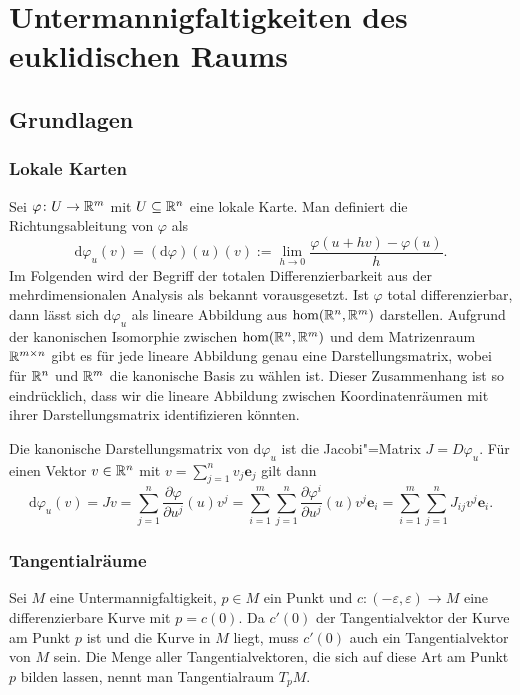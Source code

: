 
\chapter{Untermannigfaltigkeiten des euklidischen Raums}

\section{Grundlagen}

\subsection{Lokale Karten}

Sei $\varphi\colon U\to\mathbb R^m$ mit $U\subseteq\mathbb R^n$ eine lokale Karte.
Man definiert die Richtungsableitung von $\varphi$ als
\begin{equation}
\mathrm d\varphi_u(v) = (\mathrm d\varphi)(u)(v)
:= \lim_{h\to 0}\frac{\varphi(u+hv)-\varphi(u)}{h}.
\end{equation}
Im Folgenden wird der Begriff der totalen Differenzierbarkeit
aus der mehrdimensionalen Analysis als bekannt vorausgesetzt.
Ist $\varphi$ total differenzierbar, dann lässt sich
$\mathrm d\varphi_u$ als lineare Abbildung aus $\hom(\mathbb R^n,\mathbb R^m)$
darstellen. Aufgrund der kanonischen Isomorphie zwischen
$\hom(\mathbb R^n,\mathbb R^m)$ und dem Matrizenraum $\mathbb R^{m\times n}$ gibt
es für jede lineare Abbildung genau eine Darstellungsmatrix,
wobei für $\mathbb R^n$ und $\mathbb R^m$ die kanonische Basis zu wählen ist.
Dieser Zusammenhang ist so eindrücklich, dass wir die lineare
Abbildung zwischen Koordinatenräumen mit ihrer Darstellungsmatrix
identifizieren könnten.

Die kanonische Darstellungsmatrix von $\mathrm d\varphi_u$ ist die
Jacobi"=Matrix $J=D\varphi_u$. Für einen Vektor $v\in\mathbb R^n$ mit
$v=\sum_{j=1}^n v_j \mathbf e_j$ gilt dann
\begin{equation}
\mathrm d\varphi_u(v) = Jv
= \sum_{j=1}^n \frac{\partial\varphi}{\partial u^j}(u) v^j
= \sum_{i=1}^m\sum_{j=1}^n \frac{\partial\varphi^i}{\partial u^j}(u) v^j\mathbf e_i
= \sum_{i=1}^m\sum_{j=1}^n J_{ij} v^j\mathbf e_i.
\end{equation}

\subsection{Tangentialräume}

Sei $M$ eine Untermannigfaltigkeit, $p\in M$ ein Punkt und
$c\colon (-\varepsilon,\varepsilon)\to M$ eine differenzierbare Kurve
mit $p=c(0)$. Da $c'(0)$ der Tangentialvektor der Kurve am Punkt $p$
ist und die Kurve in $M$ liegt, muss $c'(0)$ auch ein Tangentialvektor
von $M$ sein. Die Menge aller Tangentialvektoren, die sich auf
diese Art am Punkt $p$ bilden lassen, nennt man Tangentialraum $T_p M$.

